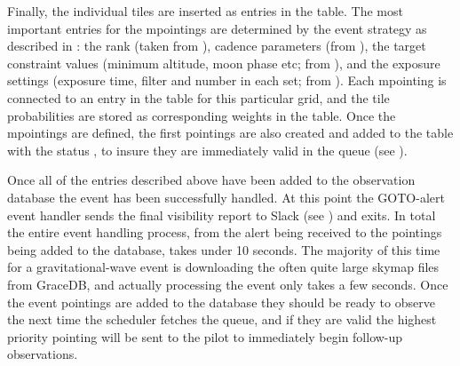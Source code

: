 \begin{colsection}
Finally, the individual tiles are inserted as entries in the  table. The most important entries for the mpointings are determined by the event strategy as described in : the rank (taken from ), cadence parameters (from ), the target constraint values (minimum altitude, moon phase etc; from ), and the exposure settings (exposure time, filter and number in each set; from ). Each mpointing is connected to an entry in the  table for this particular grid, and the tile probabilities are stored as corresponding weights in the  table. Once the mpointings are defined, the first pointings are also created and added to the  table with the status , to insure they are immediately valid in the queue (see ).

Once all of the entries described above have been added to the observation database the event has been successfully handled. At this point the GOTO-alert event handler sends the final visibility report to Slack (see ) and exits. In total the entire event handling process, from the alert being received to the pointings being added to the database, takes under 10 seconds. The majority of this time for a gravitational-wave event is downloading the often quite large skymap files from GraceDB, and actually processing the event only takes a few seconds. Once the event pointings are added to the database they should be ready to observe the next time the scheduler fetches the queue, and if they are valid the highest priority pointing will be sent to the pilot to immediately begin follow-up observations.

\end{colsection}

